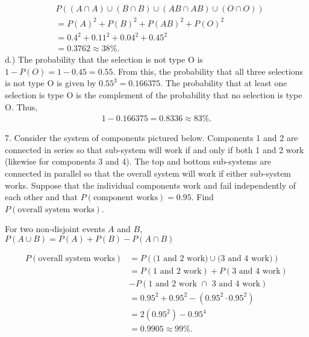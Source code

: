 \documentclass{report}
\begin{document}
    \begin{align*}
        &P( (A \cap A) \cup (B \cap B) \cup (AB \cap AB) \cup (O \cap O)) \\
        &=P(A)^{2} + P(B)^{2} + P(AB)^{2} + P(O)^{2} \\
        &=0.4^{2} + 0.11^{2} + 0.04^{2} + 0.45^{2} \\
        &=0.3762 \approx  38\%
    .\end{align*}
    \bigbreak \noindent 
    d.) The probability that the selection is not type O is $1-P(O) = 1-0.45  = 0.55$. From this, the probability that all three selections is not type O is given by $0.55^{3} =0.166375$. The probability that at least one selection is type O is the complement of the probability that no selection is type O. Thus, 
    \begin{align*}
        1-0.166375 = 0.8336 \approx 83\%
    .\end{align*}
    

    \pagebreak \bigbreak \noindent 
    \begin{mdframed}
        7. Consider the system of components pictured below. Components 1 and 2 are connected in series so that sub-system will work if and only if both 1 and 2 work (likewise for components 3 and 4). The top and bottom sub-systems are connected in parallel so that the overall system will work if either sub-system works. Suppose that the individual components work and fail independently of each other and that \(P(\text{component works}) = 0.95\). Find \(P(\text{overall system works})\).
    \end{mdframed}
    \bigbreak \noindent 
    \begin{remark}
        
        For two non-disjoint events $A$ and $B$, $P(A\cup B) = P(A)+P(B) - P(A\cap B)$
    \end{remark}
    
    \bigbreak \noindent 
    \begin{align*}
        P(\text{overall system works}) &= P(\text{(1 and 2 work)} \cup \text{(3 and 4 work)}) \\
        &=P(\text{1 and 2 work}) + P(\text{3 and 4 work})  \\
        &- P(\text{1 and 2 work } \cap \text{ 3 and 4 work} ) \\
        &= 0.95^{2} + 0.95^{2} - (0.95^{2} \cdot 0.95^{2}) \\
        &=2(0.95^{2}) - 0.95^{4} \\
        &=0.9905 \approx 99\%
    .\end{align*}
\end{document}
